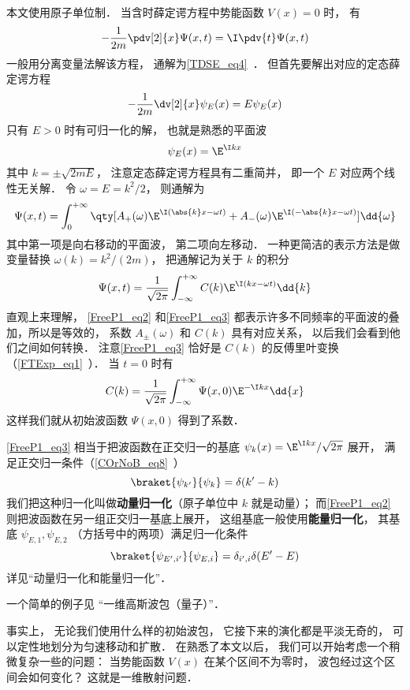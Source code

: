 

本文使用原子单位制． 当含时薛定谔方程中势能函数 $V(x) = 0$ 时， 有
\begin{equation}\label{FreeP1_eq1}
-\frac{1}{2m}\pdv[2]{x}\Psi(x,t) = \I \pdv{t} \Psi(x,t)
\end{equation}
一般用分离变量法解该方程， 通解为\autoref{TDSE_eq4}~． 但首先要解出对应的定态薛定谔方程
\begin{equation}
-\frac{1}{2m}\dv[2]{x}\psi_E(x) = E \psi_E(x)
\end{equation}
只有 $E > 0$ 时有可归一化的解， 也就是熟悉的平面波
\begin{equation}
\psi_E(x) = \E^{\I k x}
\end{equation}
其中 $k = \pm\sqrt{2mE}$， 注意定态薛定谔方程具有二重简并， 即一个 $E$ 对应两个线性无关解． 令 $\omega = E = k^2/2$， 则通解为
\begin{equation}\label{FreeP1_eq2}
\Psi(x,t) = \int_{0}^{+\infty} \qty[A_+(\omega) \E^{\I (\abs{k}x - \omega t)} + A_-(\omega) \E^{\I (-\abs{k}x - \omega t)}] \dd{\omega}
\end{equation}
其中第一项是向右移动的平面波， 第二项向左移动． 一种更简洁的表示方法是做变量替换 $\omega(k) = k^2/(2m)$， 把通解记为关于 $k$ 的积分
\begin{equation}\label{FreeP1_eq3}
\Psi(x,t) = \frac{1}{\sqrt{2\pi}} \int_{-\infty}^{+\infty} C(k) \E^{\I (k x - \omega t)} \dd{k}
\end{equation}
直观上来理解， \autoref{FreeP1_eq2} 和\autoref{FreeP1_eq3} 都表示许多不同频率的平面波的叠加，所以是等效的， 系数 $A_\pm(\omega)$ 和 $C(k)$ 具有对应关系， 以后我们会看到他们之间如何转换． 注意\autoref{FreeP1_eq3} 恰好是 $C(k)$ 的反傅里叶变换（\autoref{FTExp_eq1}~）． 当 $t = 0$ 时有
\begin{equation}
C(k) = \frac{1}{\sqrt{2\pi}} \int_{-\infty}^{+\infty} \Psi(x,0) \E^{-\I k x} \dd{x}
\end{equation}
这样我们就从初始波函数 $\Psi(x,0)$ 得到了系数．

\autoref{FreeP1_eq3} 相当于把波函数在正交归一的基底 $\psi_k(x) = \E^{\I kx}/\sqrt{2\pi}$ 展开， 满足正交归一条件（\autoref{COrNoB_eq8}~）
\begin{equation}
\braket{\psi_{k'}}{\psi_k} = \delta(k' - k)
\end{equation}
我们把这种归一化叫做\textbf{动量归一化}（原子单位中 $k$ 就是动量）； 而\autoref{FreeP1_eq2} 则把波函数在另一组正交归一基底上展开， 这组基底一般使用\textbf{能量归一化}， 其基底 $\psi_{E,1}, \psi_{E,2}$ （方括号中的两项）满足归一化条件
\begin{equation}
\braket{\psi_{E',i'}}{\psi_{E,i}} = \delta_{i',i}\delta(E' - E)
\end{equation}
详见“动量归一化和能量归一化”．

一个简单的例子见 “一维高斯波包（量子）”．

事实上， 无论我们使用什么样的初始波包， 它接下来的演化都是平淡无奇的， 可以定性地划分为匀速移动和扩散． 在熟悉了本文以后， 我们可以开始考虑一个稍微复杂一些的问题： 当势能函数 $V(x)$ 在某个区间不为零时， 波包经过这个区间会如何变化？ 这就是一维散射问题．
